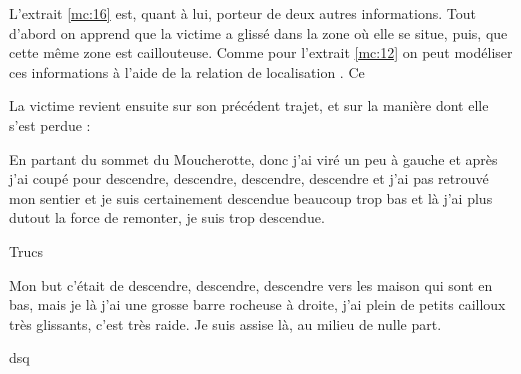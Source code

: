 L'extrait \ref{mc:16} est, quant à lui, porteur de deux autres
informations. Tout d'abord on apprend que la victime a glissé dans la
zone où elle se situe, puis, que cette même zone est
caillouteuse.
%
Comme pour l'extrait \ref{mc:12} on peut modéliser ces
informations à l'aide de la relation de localisation
. Ce 


La victime revient ensuite sur son précédent trajet, et sur la manière
dont elle s'est perdue :
%
\begin{dialogue*}
  \Req {} En partant du sommet du Moucherotte, donc j’ai
  viré un peu à gauche et  après j'ai coupé pour
   descendre, descendre, descendre, descendre et
   j’ai pas retrouvé mon sentier et 
  je suis certainement descendue beaucoup trop bas et là
   j’ai plus dutout la force de remonter, je suis trop
  descendue.
\end{dialogue*}
% 
Trucs

\begin{dialogue*}
  \Req {} Mon but c’était de descendre, descendre,
  descendre vers les maison qui sont en bas,  mais je
  là j’ai une grosse barre rocheuse à droite,  j’ai
  plein de petits cailloux très glissants,  c’est très
  raide.  Je suis assise là, au milieu de nulle part.
\end{dialogue*}
% 
dsq

